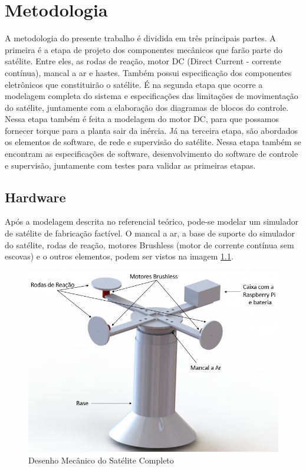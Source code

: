 \chapter{Metodologia}

A metodologia do presente trabalho é dividida em três principais partes. A primeira é a etapa de projeto dos componentes mecânicos que farão parte do satélite. Entre eles, as rodas de reação, motor DC (Direct Current - corrente contínua), mancal a ar e hastes. Também possui especificação dos componentes eletrônicos que constituirão o satélite. É na segunda etapa que ocorre a modelagem completa do sistema e especificações das limitações de movimentação do satélite, juntamente com a elaboração dos diagramas de blocos do controle. Nessa etapa também é feita a modelagem do motor DC, para que possamos fornecer torque para a planta sair da inércia. Já na terceira etapa, são abordados os elementos de software, de rede e supervisão do satélite. Nessa etapa também se encontram as especificações de software, desenvolvimento do software de controle e supervisão, juntamente com testes para validar as primeiras etapas.

\section{Hardware}

Após a modelagem descrita no referencial teórico, pode-se modelar um simulador de satélite de fabricação factível.  O mancal a ar, a base de suporte do simulador do satélite, rodas de reação, motores Brushless (motor de corrente contínua sem escovas) e o outros elementos, podem ser vistos na imagem \ref{fig:satelite_completo}.

\begin{figure}[H]
  \caption{Desenho Mecânico do Satélite Completo}
  \begin{center}
      \includegraphics[scale=.6]{img/satelite_completo}
  \end{center}
  \label{fig:satelite_completo}
\end{figure}

